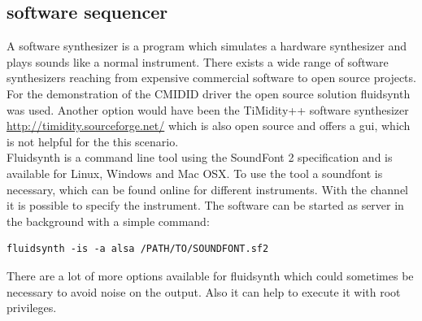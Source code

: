 \documentclass[paper=a4,fontsize=11pt,twocolumn,pagesize,bibtotoc]{scrartcl}
\begin{document}
\subsection{software sequencer}
\label{softwaresequencer}
A software synthesizer is a program which simulates a hardware synthesizer and plays sounds like a normal instrument. There exists a wide range of software synthesizers reaching from expensive commercial software to open source projects. For the demonstration of the CMIDID driver the open source solution fluidsynth was used. Another option would have been the
TiMidity++ software synthesizer \url{http://timidity.sourceforge.net/} which is also open source and offers a gui, which is not helpful for the this scenario.
\\
Fluidsynth is a command line tool using the SoundFont 2 specification and is available for Linux, Windows and Mac OSX. To use the tool a soundfont is necessary, which can be found online for different instruments. With the channel it is possible to specify the instrument. The software can be started as server in the background with a simple command:
\begin{lstlisting}
fluidsynth -is -a alsa /PATH/TO/SOUNDFONT.sf2
\end{lstlisting}
There are a lot of more options available for fluidsynth which could sometimes be necessary to avoid noise on the output. Also it can help to execute it with root privileges.
\cite{fluidsynth}



	
	
\end{document}
